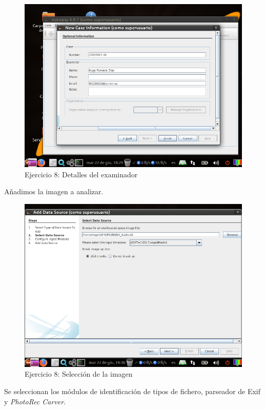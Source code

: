 \documentclass[11pt]{article}
\begin{document}
\begin{figure}[H]
    \caption{Ejercicio 8: Detalles del examinador}
    \centering
    \includegraphics[scale=0.7]{e8-2.png}
\end{figure}

Añadimos la imagen a analizar.

\begin{figure}[H]
    \caption{Ejercicio 8: Selección de la imagen}
    \centering
    \includegraphics[scale=0.7]{e8-3.png}
\end{figure}

Se seleccionan los módulos de identificación de tipos de fichero, parseador de Exif y \textit{PhotoRec Carver}.
\end{document}
